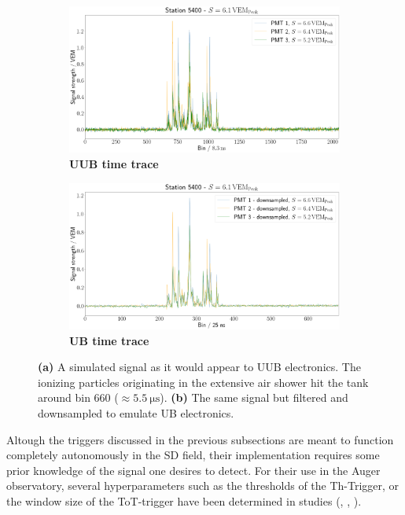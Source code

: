 \begin{figure}
	\begin{subfigure}[b]{0.5\textwidth}
		\centering
		\includegraphics[width=\textwidth]{./plots/time_trace_UUB.png}
		\caption{\textbf{UUB time trace}}
		\label{fig:uub-time-trace}
	\end{subfigure}
	\hfill
	\begin{subfigure}[b]{0.5\textwidth}
		\centering
		\includegraphics[width=\textwidth]{./plots/time_trace_UB.png}
		\caption{\textbf{UB time trace}}
		\label{fig:ub-time-trace}
	\end{subfigure}
	\caption{\textbf{(a)} A simulated signal as it would appear to UUB electronics. The ionizing particles originating in the extensive air shower hit the tank 
	around bin 660 ($\approx\SI{5.5}{\micro\second}$). \textbf{(b)} The same signal but filtered and downsampled to emulate UB electronics.}
	\label{fig:uub-ub-comparison}
\end{figure}

Altough the triggers discussed in the previous subsections are meant to function completely autonomously in the SD field, their implementation requires some prior 
knowledge of the signal one desires to detect. For their use in the Auger observatory, several hyperparameters such as the thresholds of the Th-Trigger, or the 
window size of the ToT-trigger have been determined in studies (\cite{bertou2006calibration}, \cite{triggerSettings}, \cite{ToTtriggerSetting}). 

